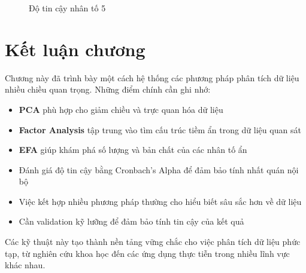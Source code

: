 \begin{figure}[h!]
\begin{minipage}{0.3\textwidth}
        \caption{Độ tin cậy nhân tố 5}
    \end{minipage}
\end{figure}



\section{Kết luận chương}

Chương này đã trình bày một cách hệ thống các phương pháp phân tích dữ liệu nhiều chiều quan trọng. Những điểm chính cần ghi nhớ:

\begin{itemize}
    \item \textbf{PCA} phù hợp cho giảm chiều và trực quan hóa dữ liệu
    \item \textbf{Factor Analysis} tập trung vào tìm cấu trúc tiềm ẩn trong dữ liệu quan sát
    \item \textbf{EFA} giúp khám phá số lượng và bản chất của các nhân tố ẩn
    \item Đánh giá độ tin cậy bằng Cronbach's Alpha để đảm bảo tính nhất quán nội bộ
    \item Việc kết hợp nhiều phương pháp thường cho hiểu biết sâu sắc hơn về dữ liệu
    \item Cần validation kỹ lưỡng để đảm bảo tính tin cậy của kết quả
\end{itemize}

Các kỹ thuật này tạo thành nền tảng vững chắc cho việc phân tích dữ liệu phức tạp, từ nghiên cứu khoa học đến các ứng dụng thực tiễn trong nhiều lĩnh vực khác nhau.